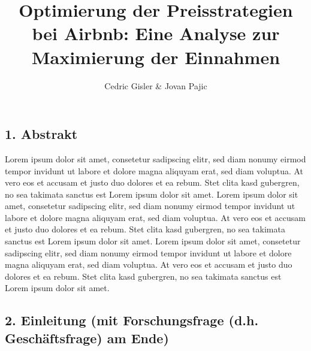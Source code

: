 \documentclass[
  journal,
]{IEEEtran}%
\title{Optimierung der Preisstrategien bei Airbnb: Eine Analyse zur
Maximierung der Einnahmen}
\author{
Cedric Gisler \& Jovan Pajic%

}
\begin{document}


\maketitle


%

\ifdefined\Shaded\renewenvironment{Shaded}{\begin{tcolorbox}[boxrule=0pt, borderline west={3pt}{0pt}{shadecolor}, sharp corners, interior hidden, frame hidden, enhanced, breakable]}{\end{tcolorbox}}\fi

\hypertarget{abstrakt}{%
\subsection{1. Abstrakt}\label{abstrakt}}

Lorem ipsum dolor sit amet, consetetur sadipscing elitr, sed diam nonumy
eirmod tempor invidunt ut labore et dolore magna aliquyam erat, sed diam
voluptua. At vero eos et accusam et justo duo dolores et ea rebum. Stet
clita kasd gubergren, no sea takimata sanctus est Lorem ipsum dolor sit
amet. Lorem ipsum dolor sit amet, consetetur sadipscing elitr, sed diam
nonumy eirmod tempor invidunt ut labore et dolore magna aliquyam erat,
sed diam voluptua. At vero eos et accusam et justo duo dolores et ea
rebum. Stet clita kasd gubergren, no sea takimata sanctus est Lorem
ipsum dolor sit amet. Lorem ipsum dolor sit amet, consetetur sadipscing
elitr, sed diam nonumy eirmod tempor invidunt ut labore et dolore magna
aliquyam erat, sed diam voluptua. At vero eos et accusam et justo duo
dolores et ea rebum. Stet clita kasd gubergren, no sea takimata sanctus
est Lorem ipsum dolor sit amet.

\hypertarget{einleitung-mit-forschungsfrage-d.h.-geschuxe4ftsfrage-am-ende}{%
\subsection{2. Einleitung (mit Forschungsfrage (d.h. Geschäftsfrage) am
Ende)}\label{einleitung-mit-forschungsfrage-d.h.-geschuxe4ftsfrage-am-ende}}
\end{document}
